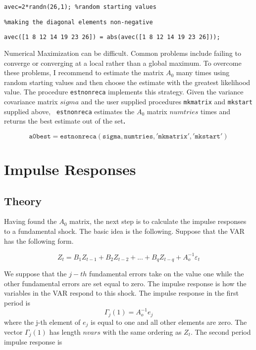 \documentclass{article}
\begin{document}
\texttt{avec=2*randn(26,1); \%random starting values}

\texttt{\%making the diagonal elements non-negative}

\texttt{avec([1 8 12 14 19 23 26]) = abs(avec([1 8 12 14 19 23 26]));}

Numerical Maximization can be difficult. Common problems include failing to
converge or converging at a local rather than a global maximum. To overcome
these problems, I recommend to estimate the matrix $A_{0}$ many times using
random starting values and then choose the estimate with the greatest
likelihood value. The procedure \texttt{estnonreca} implements this
strategy. Given the variance covariance matrix $sigma$ and the user supplied
procedures \texttt{mkmatrix} and \texttt{mkstart} supplied above, \texttt{%
estnonreca} estimates the $A_{0}$ matrix $numtries$ times and returns the
best estimate out of the set\textbf{. \ }

\begin{equation*}
\mathtt{a0best=estnonreca(sigma,numtries,\prime mkmatrix\prime ,\prime
mkstart\prime )}
\end{equation*}

\section{Impulse Responses}

\subsection{Theory}

Having found the $A_{0}$ matrix, the next step is to calculate the impulse
responses to a fundamental shock. The basic idea is the following. Suppose
that the VAR has the following form.

\begin{equation*}
Z_{t}=B_{1}Z_{t-1}+B_{2}Z_{t-2}+...+B_{q}Z_{t-q}+A_{o}^{-1}\varepsilon _{t}
\end{equation*}

We suppose that the $j-th$ fundamental errors take on the value one while
the other fundamental errors are set equal to zero. The impulse response is
how the variables in the VAR respond to this shock. The impulse response in
the first period is 
\begin{equation*}
\Gamma _{j}(1)=A_{o}^{-1}e_{j}
\end{equation*}
where the j-th element of $e_{j}$ is equal to one and all other elements are
zero. The vector $\Gamma _{j}(1)$ has length $nvars$ with the same ordering
as $Z_{t}.$ The second period impulse response is
\end{document}
